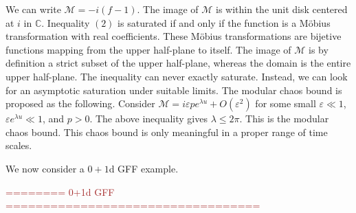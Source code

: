 \documentclass[a4paper,11pt]{article}
\theoremstyle{definition}
\newcommand{\mM}{\mathcal{M}}
\newcommand{\KL}[1]{\textcolor{brown}{#1}}
\begin{document}
We can write $\mM = -i(f-1)$. The image of $\mM$ is within the unit disk centered at $i$ in $\mathbb{C}$. Inequality $(2)$ is saturated if and only if the function is a M\"obius transformation with real coefficients. These M\"obius transformations are bijetive functions mapping from the upper half-plane to itself. The image of $\mM$ is by definition a strict subset of the upper half-plane, whereas the domain is the entire upper half-plane. The inequality can never exactly saturate. Instead, we can look for an asymptotic saturation under suitable limits. The modular chaos bound is proposed as the following\cite{}. Consider $\mM = i\varepsilon p e^{\lambda u} + O(\varepsilon^2)$ for some small $\varepsilon \ll 1$, $\varepsilon e^{\lambda u} \ll 1$, and $p>0$. The above inequality gives $\lambda \leq 2\pi$. This is the modular chaos bound. This chaos bound is only meaningful in a proper range of time scales. 

We now consider a $0+1$d GFF example.

\KL{======== 0+1d GFF ==================================}
\end{document}
